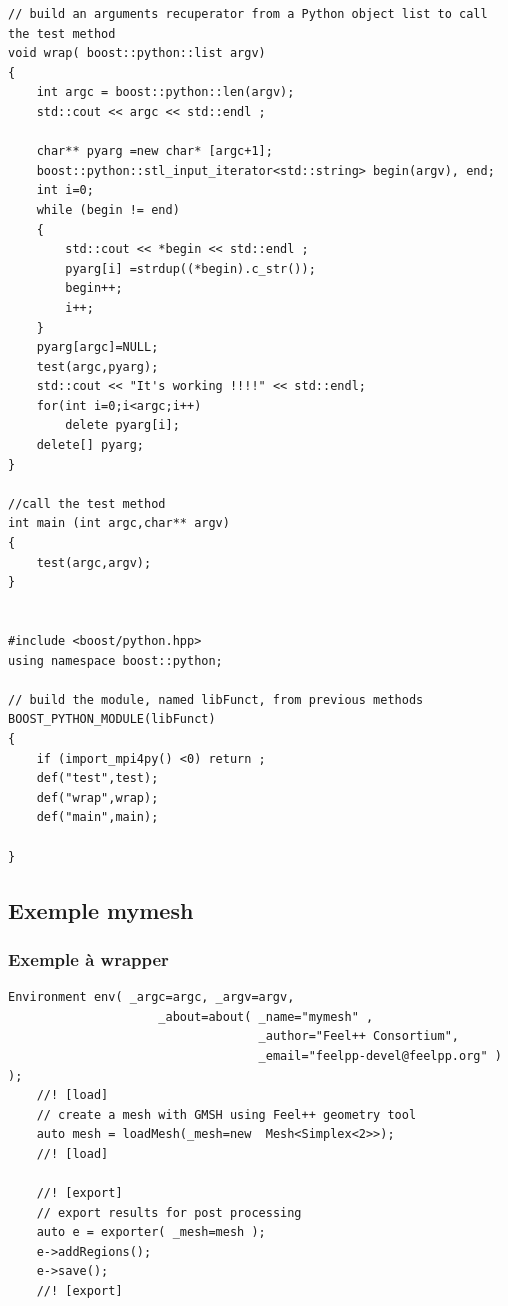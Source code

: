 \documentclass[french,12pt]{article}
\begin{document}
\begin{lstlisting}
// build an arguments recuperator from a Python object list to call the test method
void wrap( boost::python::list argv)
{
    int argc = boost::python::len(argv);
    std::cout << argc << std::endl ;
        
    char** pyarg =new char* [argc+1];
    boost::python::stl_input_iterator<std::string> begin(argv), end;
    int i=0;
    while (begin != end)
    {
        std::cout << *begin << std::endl ;
        pyarg[i] =strdup((*begin).c_str());
        begin++;
        i++;
    }
    pyarg[argc]=NULL;
    test(argc,pyarg);
    std::cout << "It's working !!!!" << std::endl; 
    for(int i=0;i<argc;i++)
        delete pyarg[i];
    delete[] pyarg;
}

//call the test method 
int main (int argc,char** argv)
{
    test(argc,argv);
}    


#include <boost/python.hpp>
using namespace boost::python;

// build the module, named libFunct, from previous methods
BOOST_PYTHON_MODULE(libFunct)
{
    if (import_mpi4py() <0) return ;
    def("test",test); 
    def("wrap",wrap);
    def("main",main);
   
}
\end{lstlisting}

\subsection{Exemple mymesh}
\subsubsection{Exemple à wrapper}
\begin{lstlisting}
Environment env( _argc=argc, _argv=argv,
                     _about=about( _name="mymesh" ,
                                   _author="Feel++ Consortium",
                                   _email="feelpp-devel@feelpp.org" ) );
    //! [load]
    // create a mesh with GMSH using Feel++ geometry tool
    auto mesh = loadMesh(_mesh=new  Mesh<Simplex<2>>);
    //! [load]

    //! [export]
    // export results for post processing
    auto e = exporter( _mesh=mesh );
    e->addRegions();
    e->save();
    //! [export]

\end{lstlisting}
\end{document}

